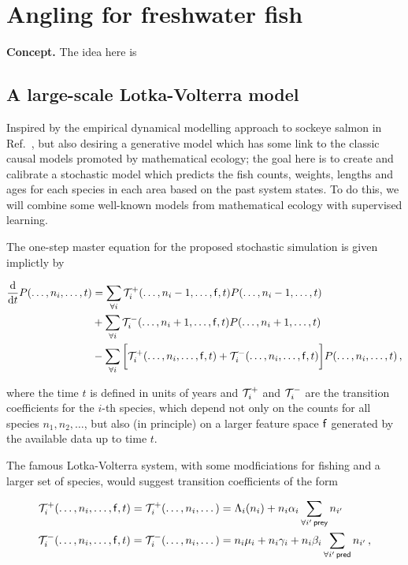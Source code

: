 \documentclass{book}
\begin{document}
\chapter{\sffamily Angling for freshwater fish}

{\bfseries\sffamily Concept.} The idea here is 

\section{\sffamily A large-scale Lotka-Volterra model}

Inspired by the empirical dynamical modelling approach to sockeye salmon in Ref.~\cite{ye2015equation}, but also desiring a generative model which has some link to the classic causal models promoted by mathematical ecology; the goal here is to create and calibrate a stochastic model which predicts the fish counts, weights, lengths and ages for each species in each area based on the past system states. To do this, we will combine some well-known models from mathematical ecology with supervised learning.

The one-step master equation for the proposed stochastic simulation is given implictly by

\begin{align}
\frac{{\rm d}}{{\rm d} t} P(\dots, n_{i}, \dots, t) &= \sum_{\forall i}{\cal T}^{+}_{i}(\dots, n_i-1, \dots, {\sf f}, t)P(\dots, n_{i}-1, \dots, t) \\
&+ \sum_{\forall i}{\cal T}^{-}_{i}(\dots, n_i+1, \dots, {\sf f}, t)P(\dots, n_{i}+1, \dots, t) \\
&- \sum_{\forall i}\bigg[ {\cal T}^{+}_{i}(\dots, n_i, \dots, {\sf f}, t) + {\cal T}^{-}_{i}(\dots, n_i, \dots, {\sf f}, t) \bigg] P(\dots, n_{i}, \dots,t) \,,
\end{align}

where the time $t$ is defined in units of years and ${\cal T}^{+}_{i}$ and ${\cal T}^{-}_{i}$ are the transition coefficients for the $i$-th species, which depend not only on the counts for all species $n_1, n_2, \dots$, but also (in principle) on a larger feature space ${\sf f}$ generated by the available data up to time $t$.

The famous Lotka-Volterra system, with some modficiations for fishing and a larger set of species, would suggest transition coefficients of the form


\begin{align}
{\cal T}^{+}_{i}(\dots, n_i, \dots, {\sf f}, t) = {\cal T}^{+}_{i}(\dots, n_i, \dots) &= \Lambda_{i}(n_{i}) + n_{i}\alpha_{i}\sum_{\forall i' \, {\sf prey}}n_{i'}\\
{\cal T}^{-}_{i}(\dots, n_i, \dots, {\sf f}, t) = {\cal T}^{-}_{i}(\dots, n_i, \dots) &= n_{i}\mu_{i} +  n_{i}\gamma_{i} + n_{i}\beta_{i} \sum_{\forall i' \, {\sf pred}} n_{i'} \,,
\end{align}
\end{document}
